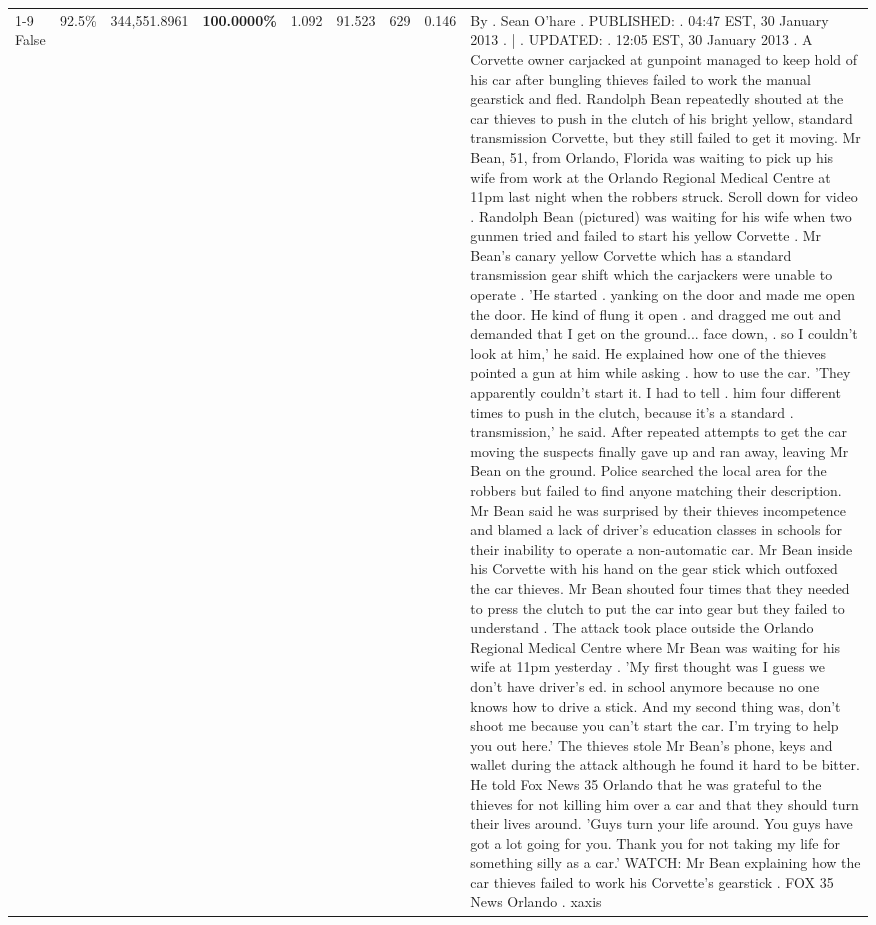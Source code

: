 \begin{table}[H]
\begin{tabular}{lllrlllll}
\cline{1-9} \cline{2-9}
False & 92.5\% & 344,551.8961 & \bfseries \color{red} 100.0000\% & 1.092 & 91.523 & 629 & 0.146 & By . Sean O'hare . PUBLISHED: . 04:47 EST, 30 January 2013 . | . UPDATED: . 12:05 EST, 30 January 2013 . A Corvette owner carjacked at gunpoint managed to keep hold of his car after bungling thieves failed to work the manual gearstick and fled. Randolph Bean repeatedly shouted at the car thieves to push in the clutch of his bright yellow, standard transmission Corvette, but they still failed to get it moving. Mr Bean, 51, from Orlando, Florida was waiting to pick up his wife from work at the Orlando Regional Medical Centre at 11pm last night when the robbers struck. Scroll down for video . Randolph Bean (pictured) was waiting for his wife when two gunmen tried and failed to start his yellow Corvette . Mr Bean's canary yellow Corvette which has a standard transmission gear shift which the carjackers were unable to operate . 'He started . yanking on the door and made me open the door. He kind of flung it open . and dragged me out and demanded that I get on the ground... face down, . so I couldn't look at him,' he said. He explained how one of the thieves pointed a gun at him while asking . how to use the car. 'They apparently couldn't start it. I had to tell . him four different times to push in the clutch, because it's a standard . transmission,' he said. After repeated attempts to get the car moving the suspects finally gave up and ran away, leaving Mr Bean on the ground. Police searched the local area for the robbers but failed to find anyone matching their description. Mr Bean said he was surprised by their thieves incompetence and blamed a lack of driver's education classes in schools for their inability to operate a non-automatic car. Mr Bean inside his Corvette with his hand on the gear stick which outfoxed the car thieves. Mr Bean shouted four times that they needed to press the clutch to put the car into gear but they failed to understand . The attack took place outside the Orlando Regional Medical Centre where Mr Bean was waiting for his wife at 11pm yesterday . 'My first thought was I guess we don't have driver's ed. in school anymore because no one knows how to drive a stick. And my second thing was, don't shoot me because you can't start the car. I'm trying to help you out here.' The thieves stole Mr Bean's phone, keys and wallet during the attack although he found it hard to be bitter. He told Fox News 35 Orlando that he was grateful to the thieves for not killing him over a car and that they should turn their lives around. 'Guys turn your life around. You guys have got a lot going for you. Thank you for not taking my life for something silly as a car.' WATCH: Mr Bean explaining how the car thieves failed to work his Corvette's gearstick . FOX 35 News Orlando . xaxis \\

\end{tabular}
\end{table}
